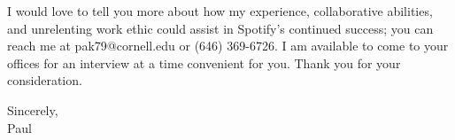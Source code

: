 \documentclass[]{deedy-resume-openfont}
\begin{document}
I would love to tell you more about how my experience, collaborative abilities, and unrelenting work ethic could assist in Spotify’s continued success; you can reach me at pak79@cornell.edu or (646) 369-6726. I am available to come to your offices for an interview at a time convenient for you. Thank you for your consideration.
\vspace{10 mm}

Sincerely,\\
Paul
\end{document}
